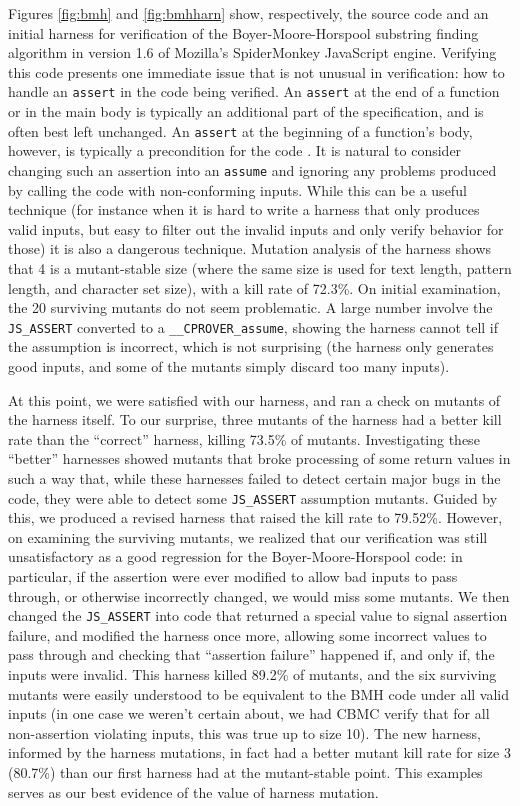 \documentclass[conference]{IEEEtran}
\begin{document}
Figures \ref{fig:bmh} and \ref{fig:bmhharn} show, respectively, the
source code and an initial harness for verification of the
Boyer-Moore-Horspool substring finding algorithm \cite{BMH,CFV13} in
version 1.6 of Mozilla's SpiderMonkey JavaScript engine.  Verifying
this code presents one immediate issue that is not unusual in
verification: how to handle an {\tt assert} in the code being
verified.  An {\tt assert} at the end of a function or in the main
body is typically an additional part of the specification, and is
often best left unchanged.  An {\tt assert} at the beginning of a
function's body, however, is typically a precondition for the code \cite{CFV13}.  It is natural to consider changing such an assertion into
an {\tt assume} and ignoring any problems produced by calling the code
with non-conforming inputs.  While this can be a useful technique (for
instance when it is hard to write a harness that only produces valid
inputs, but easy to filter out the invalid inputs and only verify
behavior for those) it is also a dangerous technique.  Mutation
analysis of the harness shows that 4 is a mutant-stable size (where
the same size is used for text length, pattern length, and character
set size), with a kill rate of 72.3\%.  On initial examination, the 20
surviving mutants do not seem problematic.  A large number involve the
{\tt JS\_ASSERT} converted to a {\tt \_\_CPROVER\_assume}, showing the
harness cannot tell if the assumption is incorrect, which is not
surprising (the harness only generates good inputs, and some of the
mutants simply discard too many inputs).

At this point, we were satisfied with our harness, and ran a check on
mutants of the harness itself.  To our surprise, three mutants of the
harness had a better kill rate than the ``correct'' harness, killing
73.5\% of mutants.  Investigating these ``better'' harnesses showed
mutants that broke processing of some return values in such a way
that, while these harnesses failed to detect certain major bugs in the
code, they were able to detect some {\tt JS\_ASSERT} assumption
mutants.  Guided by this, we produced a revised harness that raised
the kill rate to 79.52\%.  However, on examining the surviving
mutants, we realized that our verification was still unsatisfactory as
a good regression for the Boyer-Moore-Horspool code: in particular, if
the assertion were ever modified to allow bad inputs to pass through,
or otherwise incorrectly changed, we would miss some mutants.  We then
changed the {\tt JS\_ASSERT} into code that returned a special value
to signal assertion failure, and modified the harness once more,
allowing some incorrect values to pass through and checking that
``assertion failure'' happened if, and only if, the inputs were
invalid.  This harness killed 89.2\% of mutants, and the six surviving
mutants were easily understood to be equivalent to the BMH code under
all valid inputs (in one case we weren't certain about, we had CBMC
verify that for all non-assertion violating inputs, this was true up
to size 10).  The new harness, informed by the harness mutations, in
fact had a better mutant kill rate for size 3 (80.7\%) than our first
harness had at the mutant-stable point.  This examples serves as our
best evidence of the value of harness mutation.
\end{document}
